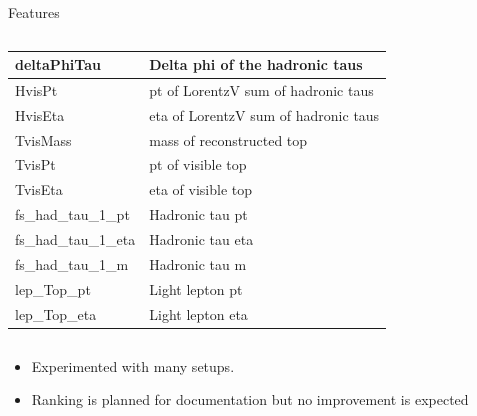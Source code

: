 \begin{frame}{Features}
\begin{columns}
\begin{column}{0.5\textwidth}
{\begin{tabular}{|l|l|}
                 deltaPhiTau          & Delta phi of the hadronic taus        \\ \hline
                 HvisPt               & pt of LorentzV sum of hadronic taus   \\ \hline
                 HvisEta              & eta of LorentzV sum of hadronic taus  \\ \hline
                 TvisMass             & mass of reconstructed top             \\ \hline
                 TvisPt               & pt of visible top                     \\ \hline
                 TvisEta              & eta of visible top                    \\ \hline
                 fs\_had\_tau\_1\_pt  & Hadronic tau pt                       \\ \hline
                 fs\_had\_tau\_1\_eta & Hadronic tau eta                      \\ \hline
                 fs\_had\_tau\_1\_m   & Hadronic tau m                        \\ \hline
                 lep\_Top\_pt         & Light lepton pt                       \\ \hline
                 lep\_Top\_eta        & Light lepton eta                      \\ \hline
             \end{tabular}}
        \end{column}
    \end{columns}
    \begin{itemize}
      \item Experimented with many setups.
      \item Ranking is planned for documentation but no improvement is expected
    \end{itemize}
\end{frame}



